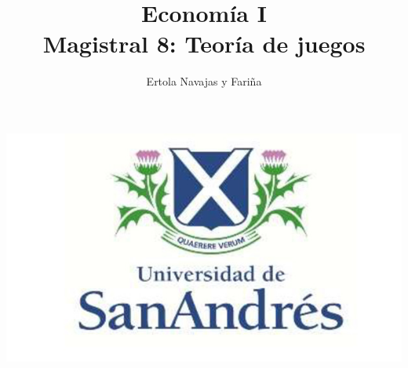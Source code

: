 \documentclass{beamer}
\title[Economía I]{Economía I \vspace{4mm}
\\ Magistral 8: Teoría de juegos}
\date{}
\author[Ertola Navajas y Fariña]{Ertola Navajas y Fariña}
\institute[]{Universidad de San Andrés}
\begin{document}
\begin{frame}
\titlepage
\centering
\includegraphics[scale=0.2]{Slides Principios de Economia/Figures/logoUDESA.jpg} 
\end{frame}






  
   





\end{document}
